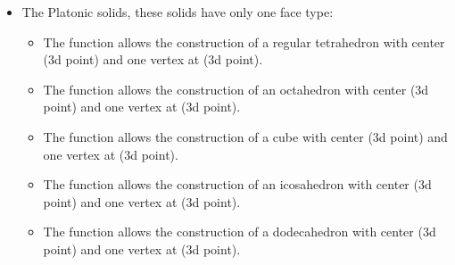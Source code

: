 \begin{itemize}
    \item The Platonic solids, these solids have only one face type:
\begin{itemize}
    \item The function  allows the construction of a regular tetrahedron with center  (3d point) and one vertex at  (3d point).
    \item The function  allows the construction of an octahedron with center  (3d point) and one vertex at  (3d point).
    \item The function  allows the construction of a cube with center  (3d point) and one vertex at  (3d point).
    \item The function  allows the construction of an icosahedron with center  (3d point) and one vertex at  (3d point).
    \item The function  allows the construction of a dodecahedron with center  (3d point) and one vertex at  (3d point).
\end{itemize}


\end{itemize}
